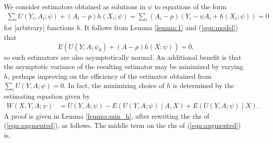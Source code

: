 \message{ !name(manuscript.tex)}\documentclass[10pt,a4paper]{amsart}
\newcommand{\EE}{E}
\begin{document}
We consider estimators obtained as solutions in $\psi$ to equations of the form
\begin{align}
\sum_iU(Y_i,A_i;\psi) + (A_i-p)h(X_i;\psi)=\sum_i (A_i-p)(Y_i-\psi A_i + h(X_i;\psi))=0\label{eqn:unaugmented}
\end{align}
for [arbitrary] functions $h$. It
follows from Lemma \ref{lemma:1} and (\ref{eqn:model}) that
\[
\EE(U(Y,A;\psi_0) + (A-p)h(X;\psi))=0,
\]
so such estimators are also
asymptotically normal. An additional benefit is that
the asymptotic variance of the resulting estimator may be minimized by
varying $h$, perhaps improving on the efficiency of the estimator obtained
from $\sum_iU(Y,A;\psi)=0$. In fact, the minimizing choice of $h$ is determined
by the estimating equation given by
\begin{align}
       W(X,Y,A;\psi)      &=U(Y,A;\psi) - \EE(U(Y,A;\psi)\mid A,X) + \EE(U(Y,A;\psi)\mid X).\label{eqn:augmented}
\end{align}
A proof is given in Lemma \ref{lemma:min_h}, after rewriting the rhs
of (\ref{eqn:augmented}), as follows. The middle term on the rhs of (\ref{eqn:augmented}) is,
\end{document}
